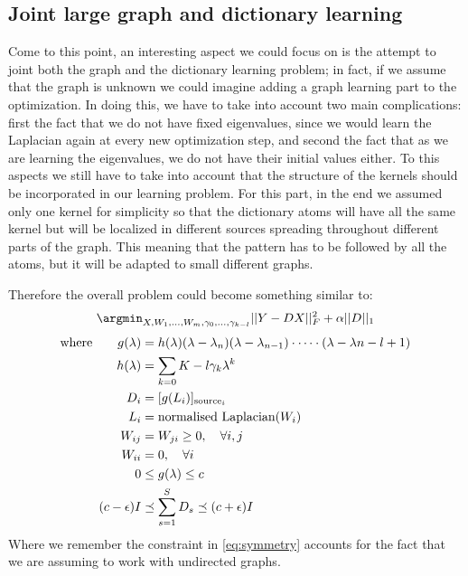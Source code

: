 \subsection{Joint large graph and dictionary learning}
Come to this point, an interesting aspect we could focus on is the attempt to joint both the graph and the dictionary learning problem; in fact, if we assume that the graph is unknown we could imagine adding a graph learning part to the optimization. In doing this, we have to take into account two main complications: first the fact that we do not have fixed eigenvalues, since we would learn the Laplacian again at every new optimization step, and second the fact that as we are learning the eigenvalues, we do not have their initial values either. To this aspects we still have to take into account that the structure of the kernels should be incorporated in our learning problem. For this part, in the end we assumed only one kernel for simplicity so that the dictionary atoms will have all the same kernel but will be localized in different sources spreading throughout different parts of the graph. This meaning that the pattern has to be followed by all the atoms, but it will be adapted to small different graphs.

Therefore the overall problem could become something similar to:
\begin{equation}
\argmin_{X,W_1,\dots,W_m,\gamma_0,\dots,\gamma_{k-l}} ||Y - DX||^2_F + \alpha||D||_1
\label{eq:overallProblem}
\end{equation}
\begin{align}
\text{where} \qquad g(\lambda) &= h(\lambda)(\lambda - \lambda_n)(\lambda - \lambda_{n-1})\cdot \dots \cdot (\lambda - \lambda{n-l+1}) \notag\\
h(\lambda) &= \sum_{k=0}{K-l}\gamma_k\lambda^{k} \notag\\
D_i &= [g(L_i)]_{\text{source}_i} \notag\\
L_i &= \text{normalised Laplacian}(W_i) \notag\\
W_{ij} &= W_{ji} \geq 0, \quad \forall i,j \label{eq:symmetry}\\
W_{ii} &= 0, \quad \forall i \notag\\
0 &\leq g(\lambda) \leq c \\
(c-\epsilon)I &\preceq \sum_{s=1}^{S}D_s \preceq (c+\epsilon)I
\end{align}
Where we remember the constraint in \ref{eq:symmetry} accounts for the fact that we are assuming to work with undirected graphs.\\

